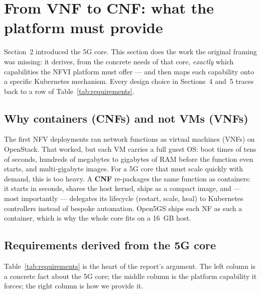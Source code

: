 \section{From VNF to CNF: what the platform must provide}

Section~2 introduced the 5G core. This section does the work the original
framing was missing: it derives, from the concrete needs of that core,
\emph{exactly} which capabilities the NFVI platform must offer --- and then
maps each capability onto a specific Kubernetes mechanism. Every design choice
in Sections~4 and~5 traces back to a row of Table~\ref{tab:requirements}.

\subsection{Why containers (CNFs) and not VMs (VNFs)}

The first NFV deployments ran network functions as virtual machines (VNFs) on
OpenStack. That worked, but each VM carries a full guest OS: boot times of
tens of seconds, hundreds of megabytes to gigabytes of RAM before the function
even starts, and multi-gigabyte images. For a 5G core that must scale quickly
with demand, this is too heavy. A \textbf{CNF} re-packages the same function as
containers: it starts in seconds, shares the host kernel, ships as a compact
image, and --- most importantly --- delegates its lifecycle (restart, scale,
heal) to Kubernetes controllers instead of bespoke automation. Open5GS ships
each NF as such a container, which is why the whole core fits on a 16~GB host.

\subsection{Requirements derived from the 5G core}

Table~\ref{tab:requirements} is the heart of the report's argument. The
left column is a concrete fact about the 5G core; the middle column is the
platform capability it forces; the right column is how we provide it.

